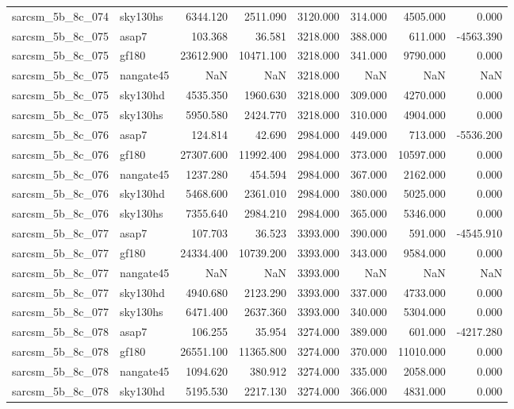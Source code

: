 \begin{tabular}{llrrrrrr}
sarcsm\_5b\_8c\_074 & sky130hs & 6344.120 & 2511.090 & 3120.000 & 314.000 & 4505.000 & 0.000 \\
sarcsm\_5b\_8c\_075 & asap7 & 103.368 & 36.581 & 3218.000 & 388.000 & 611.000 & -4563.390 \\
sarcsm\_5b\_8c\_075 & gf180 & 23612.900 & 10471.100 & 3218.000 & 341.000 & 9790.000 & 0.000 \\
sarcsm\_5b\_8c\_075 & nangate45 & NaN & NaN & 3218.000 & NaN & NaN & NaN \\
sarcsm\_5b\_8c\_075 & sky130hd & 4535.350 & 1960.630 & 3218.000 & 309.000 & 4270.000 & 0.000 \\
sarcsm\_5b\_8c\_075 & sky130hs & 5950.580 & 2424.770 & 3218.000 & 310.000 & 4904.000 & 0.000 \\
sarcsm\_5b\_8c\_076 & asap7 & 124.814 & 42.690 & 2984.000 & 449.000 & 713.000 & -5536.200 \\
sarcsm\_5b\_8c\_076 & gf180 & 27307.600 & 11992.400 & 2984.000 & 373.000 & 10597.000 & 0.000 \\
sarcsm\_5b\_8c\_076 & nangate45 & 1237.280 & 454.594 & 2984.000 & 367.000 & 2162.000 & 0.000 \\
sarcsm\_5b\_8c\_076 & sky130hd & 5468.600 & 2361.010 & 2984.000 & 380.000 & 5025.000 & 0.000 \\
sarcsm\_5b\_8c\_076 & sky130hs & 7355.640 & 2984.210 & 2984.000 & 365.000 & 5346.000 & 0.000 \\
sarcsm\_5b\_8c\_077 & asap7 & 107.703 & 36.523 & 3393.000 & 390.000 & 591.000 & -4545.910 \\
sarcsm\_5b\_8c\_077 & gf180 & 24334.400 & 10739.200 & 3393.000 & 343.000 & 9584.000 & 0.000 \\
sarcsm\_5b\_8c\_077 & nangate45 & NaN & NaN & 3393.000 & NaN & NaN & NaN \\
sarcsm\_5b\_8c\_077 & sky130hd & 4940.680 & 2123.290 & 3393.000 & 337.000 & 4733.000 & 0.000 \\
sarcsm\_5b\_8c\_077 & sky130hs & 6471.400 & 2637.360 & 3393.000 & 340.000 & 5304.000 & 0.000 \\
sarcsm\_5b\_8c\_078 & asap7 & 106.255 & 35.954 & 3274.000 & 389.000 & 601.000 & -4217.280 \\
sarcsm\_5b\_8c\_078 & gf180 & 26551.100 & 11365.800 & 3274.000 & 370.000 & 11010.000 & 0.000 \\
sarcsm\_5b\_8c\_078 & nangate45 & 1094.620 & 380.912 & 3274.000 & 335.000 & 2058.000 & 0.000 \\
sarcsm\_5b\_8c\_078 & sky130hd & 5195.530 & 2217.130 & 3274.000 & 366.000 & 4831.000 & 0.000 \\

\end{tabular}
